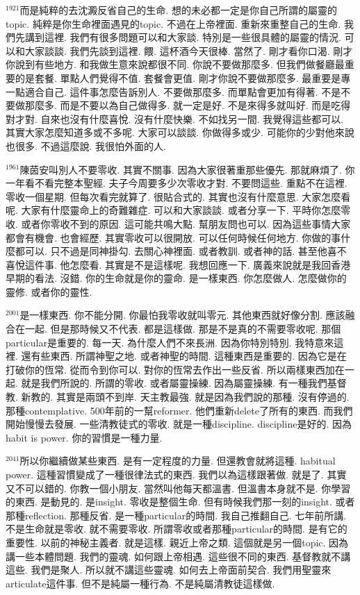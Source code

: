 \documentclass{book}
\begin{document}
$^{1921}$而是純粹的去沈澱反省自己的生命.
想的未必都一定是你自己所謂的屬靈的topic.
純粹是你生命裡面遇見的topic.
不過在上帝裡面.
重新來重整自己的生命.
我們先講到這裡.
我們有很多問題可以和大家談.
特別是一些很具體的屬靈的情況.
可以和大家談談.
我們先談到這裡.
餵.
這杯酒今天很棒.
當然了.
剛才看你口渴.
剛才你說到有些地方.
和我做生意來說都很不同.
你說不要做那麼多.
但我們做餐廳最重要的是套餐.
單點人們覺得不值.
套餐會更值.
剛才你說不要做那麼多.
最重要是專一點適合自己.
這件事怎麼告訴別人.
不要做那麼多.
而單點會更加有得著.
不是不要做那麼多.
而是不要以為自己做得多.
就一定是好.
不是來得多就叫好.
而是吃得對才對.
自來也沒有什麼喜悅.
沒有什麼快樂.
不如找另一間.
我覺得這些都可以.
其實大家怎麼知道多或不多呢.
大家可以談談.
你做得多或少.
可能你的少對他來說也很多.
不過這麼說.
我很怕外面的人.

$^{1961}$陳茵安叫別人不要零收.
其實不關事.
因為大家很著重那些優先.
那就麻煩了.
你一年看不看完整本聖經.
夫子今周要多少次零收才對.
不要問這些.
重點不在這裡.
零收一個星期.
但每次看完就算了.
很貼合式的.
其實也沒有什麼意思.
大家怎麼看呢.
大家有什麼靈命上的奇難雜症.
可以和大家談談.
或者分享一下.
平時你怎麼零收.
或者你零收不到的原因.
這可能共鳴大點.
幫朋友問也可以.
因為這些事情大家都會有機會.
也會經歷.
其實零收可以很開放.
可以任何時候任何地方.
你做的事什麼都可以.
只不過是同神掛勾.
去關心神裡面.
或者教訓.
或者神的話.
甚至他喜不喜悅這件事.
他怎麼看.
其實是不是這樣呢.
我想回應一下.
廣義來說就是我回香港早期的看法.
沒錯.
你的生命就是你的靈命.
是一樣東西.
你怎麼做人.
怎麼做你的靈修.
或者你的靈性.

$^{2001}$是一樣東西.
你不能分開.
你最怕我零收就叫零元.
其他東西就好像分割.
應該融合在一起.
但是那時候又不代表.
都是這樣做.
那是不是真的不需要零收呢.
那個particular是重要的.
每一天.
為什麼人們不來長洲.
因為你特別特別.
我特意來這裡.
還有些東西.
所謂神聖之地.
或者神聖的時間.
這種東西是重要的.
因為它是在打破你的恆常.
從而令到你可以.
對你的恆常去作出一些反省.
所以兩樣東西加在一起.
就是我們所說的.
所謂的零收.
或者屬靈操練.
因為屬靈操練.
有一種我們基督教.
新教的.
其實是兩頭不到岸.
天主教最強.
就是因為我們說的那種.
沒有停過的.
那種contemplative.
500年前的一幫reformer.
他們重新delete了所有的東西.
而我們開始慢慢去發展.
一些清教徒式的零收.
就是一種discipline.
discipline是好的.
因為habit is power.
你的習慣是一種力量.

$^{2041}$所以你繼續做某些東西.
是有一定程度的力量.
但還教會就將這種.
habitual power.
這種習慣變成了一種很律法式的東西.
我們以為這樣跟著做.
就是了.
其實又不可以錯的.
你教一個小朋友.
當然叫他每天都溫書.
但溫書本身就不是.
你學習的東西.
是動見的.
是insight.
零收是整個生命.
但有時候我們那一刻的insight.
或者那種reflection.
那種反省.
是一種particular的時間.
我自己推翻自己.
七年前所講.
不是生命就是零收.
就不需要零收.
所謂零收或者那種particular的時間.
是有它的重要性.
以前的神秘主義者.
就是這樣.
親近上帝之類.
這個就是另一個topic.
因為講一些本體問題.
我們的靈魂.
如何跟上帝相遇.
這些很不同的東西.
基督教就不講這些.
我們是聚人.
所以就不講這些靈魂.
如何去上帝面前契合.
我們用聖靈來articulate這件事.
但不是純屬一種行為.
不是純屬清教徒這樣做.
\end{document}
